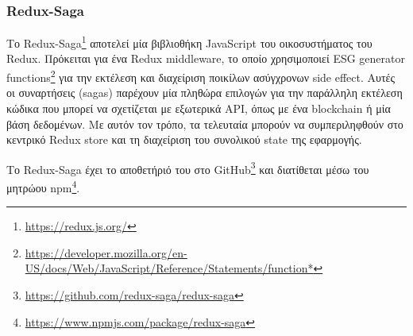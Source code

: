 \subsubsection{Redux-Saga} \label{subsection:4-2-2-3-redux-saga}


Το Redux-Saga\footnote{\url{https://redux.js.org/}} αποτελεί μία βιβλιοθήκη JavaScript του οικοσυστήματος του Redux. Πρόκειται για ένα Redux middleware, το οποίο χρησιμοποιεί ESG generator functions\footnote{\url{https://developer.mozilla.org/en-US/docs/Web/JavaScript/Reference/Statements/function*}} για την εκτέλεση και διαχείριση ποικίλων ασύγχρονων side effect. Αυτές οι συναρτήσεις (sagas) παρέχουν μία πληθώρα επιλογών για την παράλληλη εκτέλεση κώδικα που μπορεί να σχετίζεται με εξωτερικά API, όπως με ένα blockchain ή μία βάση δεδομένων. Με αυτόν τον τρόπο, τα τελευταία μπορούν να συμπεριληφθούν στο κεντρικό Redux store και τη διαχείριση του συνολικού state της εφαρμογής.

Το Redux-Saga έχει το αποθετήριό του στο GitHub\footnote{\url{https://github.com/redux-saga/redux-saga}} και διατίθεται μέσω του μητρώου npm\footnote{\url{https://www.npmjs.com/package/redux-saga}}.
